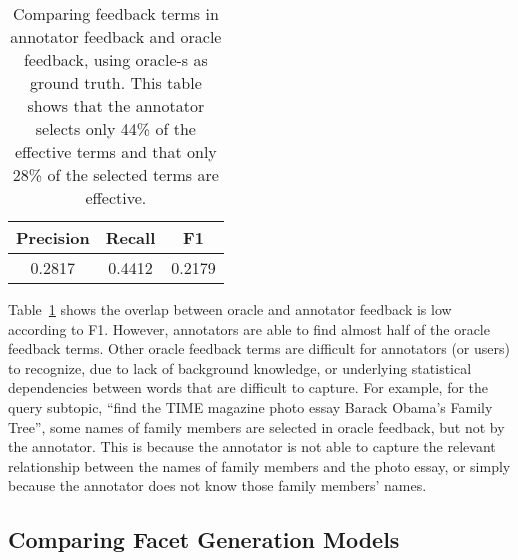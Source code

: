 \begin{table}[!ht]
\centering
\caption{Comparing feedback terms in annotator feedback and oracle feedback, using oracle-s as ground truth. This table shows that the annotator selects only 44\% of the effective terms and that only 28\% of the selected terms are effective.}
\label{tab:feedback}
\begin{tabular}{|c|c|c|} \hline
Precision & Recall & F1\\  \hline
0.2817 & 0.4412 & 0.2179 \\ \hline
\end{tabular}
\end{table}

Table~\ref{tab:feedback} shows the overlap between oracle and annotator feedback is low according to F1. However, annotators are able to find almost half of the oracle feedback terms. Other oracle feedback terms are difficult for annotators (or users) to recognize, due to lack of background knowledge, or underlying statistical dependencies between words that are difficult to capture. For example, for the query subtopic, ``find the TIME magazine photo essay Barack Obama's Family Tree'', some names of family members are selected in oracle feedback, but not by the annotator. This is because the annotator is not able to capture the relevant relationship between the names of family members and the photo essay, or simply because the annotator does not know those family members' names.

\subsection{Comparing Facet Generation Models}

